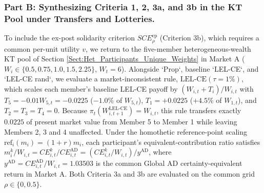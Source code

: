 \subsubsection*{Part B: Synthesizing Criteria 1, 2, 3a, and 3b in the KT Pool under Transfers and Lotteries.}
To include the ex-post solidarity criterion $SCE_\rho^{\text{ep}}$ (Criterion 3b), which requires a common per-unit utility $v$, we return to the five-member heterogeneous-wealth KT pool of Section \ref{Sect:Het_Participants_Unique_Weights} in Market A ($W_i \in \{0.5, 0.75, 1.0, 1.5, 2.25\}$, $W_t = 6$). Alongside `Prop`, baseline `LEL-CE`, and `LEL-CE rand`, we evaluate a market-inconsistent rule, $\text{LEL-CE}(\tau = 1\%)$, which scales each member's baseline LEL-CE payoff by $(W_{i,t} + T_i)/W_{i,t}$ with $T_5 = -0.01 W_{5,t} = -0.0225$ ($-1.0\%$ of $W_{5,t}$), $T_1 = +0.0225$ ($+4.5\%$ of $W_{1,t}$), and $T_2 = T_3 = T_4 = 0$. Because $\pi_t(W_{i,t+1}^{\text{LEL-CE}}) = W_{i,t}$, this rule transfers exactly $0.0225$ of present market value from Member 5 to Member 1 while leaving Members 2, 3 and 4 unaffected. Under the homothetic reference-point scaling $\text{ref}_i(m_i) = (1+r)m_i$, each participant's equivalent-contribution ratio satisfies $m_i^k / W_{i,t} = CE_{i,t}^k / CE_{i,t}^{\text{AD}} = (CE_{i,t}^k / W_{i,t}) / y^{\text{AD}}$, where $y^{\text{AD}} = CE_{i,t}^{\text{AD}} / W_{i,t} = 1.03503$ is the common Global AD certainty-equivalent return in Market A. Both Criteria 3a and 3b are evaluated on the common grid $\rho \in \{0, 0.5\}$.

